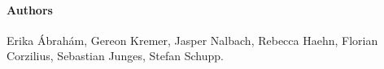 \documentclass{article}
\begin{document}
\paragraph{Authors}

Erika \'Abrah\'am,
Gereon Kremer,
Jasper Nalbach,
Rebecca Haehn,
Florian Corzilius,
Sebastian Junges,
Stefan Schupp.

\newpage



\end{document}
